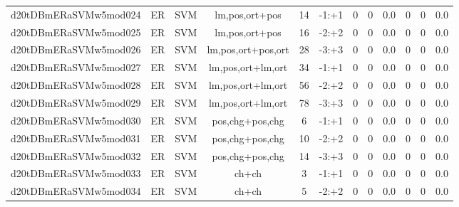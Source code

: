 \documentclass[a4paper]{article}
\begin{document}
\begin{landscape}
\begin{center}
\begin{tabular}{ |c|c|c|c|c|c|c|c|c|c|c|c|}
 	

 
 	
 	\small{ d20tDBmERaSVMw5mod024 } & ER & SVM & lm,pos,ort+pos  &  14 &  -1:+1  &  0 & 0 & 0.0  &  0 & 0 & 0.0 \\
 	

 
 	
 	\small{ d20tDBmERaSVMw5mod025 } & ER & SVM & lm,pos,ort+pos  &  16 &  -2:+2  &  0 & 0 & 0.0  &  0 & 0 & 0.0 \\
 	

 
 	
 	\small{ d20tDBmERaSVMw5mod026 } & ER & SVM & lm,pos,ort+pos,ort  &  28 &  -3:+3  &  0 & 0 & 0.0  &  0 & 0 & 0.0 \\
 	

 
 	
 	\small{ d20tDBmERaSVMw5mod027 } & ER & SVM & lm,pos,ort+lm,ort  &  34 &  -1:+1  &  0 & 0 & 0.0  &  0 & 0 & 0.0 \\
 	

 
 	
 	\small{ d20tDBmERaSVMw5mod028 } & ER & SVM & lm,pos,ort+lm,ort  &  56 &  -2:+2  &  0 & 0 & 0.0  &  0 & 0 & 0.0 \\
 	

 
 	
 	\small{ d20tDBmERaSVMw5mod029 } & ER & SVM & lm,pos,ort+lm,ort  &  78 &  -3:+3  &  0 & 0 & 0.0  &  0 & 0 & 0.0 \\
 	

 
 	
 	\small{ d20tDBmERaSVMw5mod030 } & ER & SVM & pos,chg+pos,chg  &  6 &  -1:+1  &  0 & 0 & 0.0  &  0 & 0 & 0.0 \\
 	

 
 	
 	\small{ d20tDBmERaSVMw5mod031 } & ER & SVM & pos,chg+pos,chg  &  10 &  -2:+2  &  0 & 0 & 0.0  &  0 & 0 & 0.0 \\
 	

 
 	
 	\small{ d20tDBmERaSVMw5mod032 } & ER & SVM & pos,chg+pos,chg  &  14 &  -3:+3  &  0 & 0 & 0.0  &  0 & 0 & 0.0 \\
 	

 
 	
 	\small{ d20tDBmERaSVMw5mod033 } & ER & SVM & ch+ch  &  3 &  -1:+1  &  0 & 0 & 0.0  &  0 & 0 & 0.0 \\
 	

 
 	
 	\small{ d20tDBmERaSVMw5mod034 } & ER & SVM & ch+ch  &  5 &  -2:+2  &  0 & 0 & 0.0  &  0 & 0 & 0.0 \\
 	


\end{tabular}
\end{center}
\end{landscape}
\end{document}
